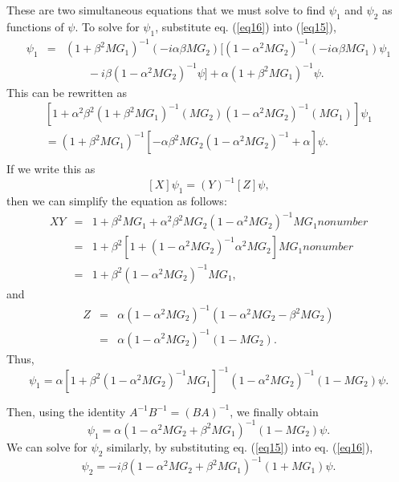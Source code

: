 These are two simultaneous equations that we must solve to find $\psi _{1} $
and $\psi _{2} $ as functions of $\psi $. To solve for $\psi _{1} $,
substitute eq. (\ref{eq16}) into (\ref{eq15}),
\begin{eqnarray}
\psi _{1} &=& (1 + \beta ^{2}MG_{1} )^{ - 1}( - i\alpha \beta MG_{2} )[(1 -
\alpha ^{2}MG_{2} )^{ - 1}( - i\alpha \beta MG_{1} )\psi _{1}
 \nonumber \\
&&\qquad  - i\beta (1-\alpha ^{2}MG_{2} )^{ - 1}\psi ]+ \alpha (1 + \beta ^{2}MG_{1} )^{ - 1}\psi
.
\label{eq17}
\end{eqnarray}
This can be rewritten as
\begin{equation}
\label{eq18}
\begin{array}{l}
 [1 + \alpha ^{2}\beta ^{2}(1 + \beta ^{2}MG_{1} )^{ - 1}(MG_{2} )(1 -
\alpha ^{2}MG_{2} )^{ - 1}(MG_{1} )]\psi _{1} \\
 = (1 + \beta ^{2}MG_{1} )^{ - 1}[ - \alpha \beta ^{2}MG_{2} (1 - \alpha
^{2}MG_{2} )^{ - 1} + \alpha ]\psi . \\
 \end{array}
\end{equation}
If we write this as
\begin{equation}
\label{eq19}
[X]\psi _{1} = (Y)^{ - 1}[Z]\psi ,
\end{equation}
then we can simplify the equation as follows:
\begin{eqnarray}
 XY&=& 1 + \beta ^2MG_1 + \alpha ^2\beta ^2MG_2 (1 - \alpha ^2MG_2 )^{- 1}MG_1 nonumber \\
  &=& 1 + \beta ^2[1 + (1 - \alpha ^2MG_2 )^{- 1}\alpha ^2MG_2 ]MG_1nonumber \\
  &=& 1 + \beta ^2(1 - \alpha ^2MG_2 )^ {- 1}MG_1 ,
\label{eq20}
\end{eqnarray}
and
\begin{eqnarray}
 Z&=& \alpha (1 - \alpha ^2MG_2 )^{- 1}(1 - \alpha ^2MG_2 - \beta ^2MG_2 )\nonumber \\
  &=& \alpha (1 - \alpha ^2MG_2 )^{- 1}(1 - MG_2 ).
\label{eq21}
\end{eqnarray}
Thus,
\begin{equation}
\label{eq22}
\psi _{1} = \alpha [1 + \beta ^{2}(1 - \alpha ^{2}MG_{2} )^{ - 1}MG_{1} ]^{
- 1}(1 - \alpha ^{2}MG_{2} )^{ - 1}(1 - MG_{2} )\psi .
\end{equation}


Then, using the identity $A^{ - 1}B^{ - 1} = (BA)^{ - 1}$, we finally obtain
\begin{equation}
\label{eq23}
\psi _{1} = \alpha (1 - \alpha ^{2}MG_{2} + \beta ^{2}MG_{1} )^{ - 1}(1 -
MG_{2} )\psi .
\end{equation}
We can solve for $\psi _{2} $ similarly, by substituting eq. (\ref{eq15}) into eq.
(\ref{eq16}),
\begin{equation}
\label{eq24}
\psi _{2} = - i\beta (1 - \alpha ^{2}MG_{2} + \beta ^{2}MG_{1} )^{ - 1}(1 +
MG_{1} )\psi .
\end{equation}



